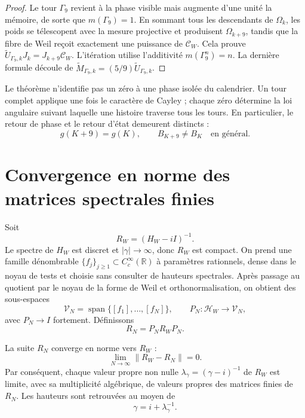 \begin{proof}
Le tour \(\Gamma_9\) revient à la phase visible mais augmente d'une
unité la mémoire, de sorte que \(m(\Gamma_9)=1\). En sommant tous les
descendants de \(\Omega_k\), les poids se télescopent avec la mesure projective
et produisent \(\Omega_{k+9}\), tandis que la fibre de Weil reçoit exactement
une puissance de \(\mathcal C_W\). Cela prouve
\(\widetilde U_{\Gamma_9,k}J_k=J_{k+9}\mathcal C_W\). L'itération utilise
l'additivité \(m(\Gamma_9^n)=n\). La dernière formule découle de
\(\widetilde M_{\Gamma_9,k}=(5/9)\widetilde U_{\Gamma_9,k}\).
\end{proof}

Le théorème n'identifie pas un zéro à une phase isolée du calendrier. Un
tour complet applique une fois le caractère de Cayley ; chaque zéro détermine
la loi angulaire suivant laquelle une histoire traverse tous les tours. En
particulier, le retour de phase et le retour d'état demeurent distincts :
\[
 g(K+9)=g(K),
 \qquad B_{K+9}\ne B_K\quad\text{en général}.
\]

\section{Convergence en norme des matrices spectrales finies}
\label{sec:cpe-convergencia-resolvente}

Soit
\[
 R_W=(H_W-iI)^{-1}.
\]
Le spectre de \(H_W\) est discret et \(|\gamma|\to\infty\), donc
\(R_W\) est compact. On prend une famille dénombrable
\(\{f_j\}_{j\ge1}\subset C_c^\infty(\mathbb R)\) à paramètres rationnels,
dense dans le noyau de tests et choisie sans consulter de hauteurs spectrales.
Après passage au quotient par le noyau de la forme de Weil et orthonormalisation, on
obtient des sous-espaces
\[
 \mathcal V_N=\operatorname{span}\{[f_1],\ldots,[f_N]\},
 \qquad P_N:\mathcal H_W\to\mathcal V_N,
\]
avec \(P_N\to I\) fortement. Définissons
\begin{equation}
 R_N=P_NR_WP_N.
 \label{eq:cpe-resolvente-finito}
\end{equation}

\begin{theorem}
\label{thm:cpe-convergencia-norma}
La suite \(R_N\) converge en norme vers \(R_W\) :
\begin{equation}
 \boxed{\lim_{N\to\infty}\|R_W-R_N\|=0.}
 \label{eq:cpe-convergencia-norma}
\end{equation}
Par conséquent, chaque valeur propre non nulle
\(\lambda_\gamma=(\gamma-i)^{-1}\) de \(R_W\) est limite, avec sa
multiplicité algébrique, de valeurs propres des matrices finies de
\(R_N\). Les hauteurs sont retrouvées au moyen de
\begin{equation}
 \gamma=i+\lambda_\gamma^{-1}.
 \label{eq:cpe-recuperacion-altura}
\end{equation}
\end{theorem}


